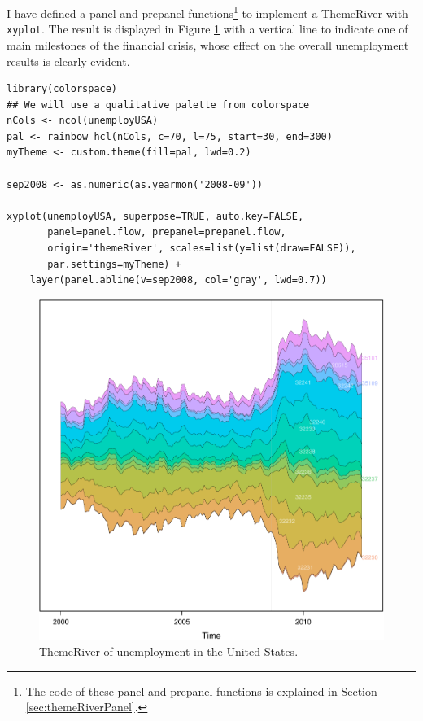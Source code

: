 \documentclass[smallroyalvopaper]{memoir}
\begin{document}
I have defined a panel and prepanel functions\footnote{The code of these panel and prepanel functions is explained
in Section \ref{sec:themeRiverPanel}.} to implement a
ThemeRiver with \texttt{xyplot}. The result is displayed in Figure
\ref{fig:unemployUSAThemeRiver} with a vertical line to indicate
one of main milestones of the financial crisis, whose effect on
the overall unemployment results is clearly evident.
\lstset{language=R,numbers=none}
\begin{lstlisting}
library(colorspace)
## We will use a qualitative palette from colorspace
nCols <- ncol(unemployUSA)
pal <- rainbow_hcl(nCols, c=70, l=75, start=30, end=300)
myTheme <- custom.theme(fill=pal, lwd=0.2)

sep2008 <- as.numeric(as.yearmon('2008-09'))

xyplot(unemployUSA, superpose=TRUE, auto.key=FALSE,
       panel=panel.flow, prepanel=prepanel.flow,
       origin='themeRiver', scales=list(y=list(draw=FALSE)),
       par.settings=myTheme) +
    layer(panel.abline(v=sep2008, col='gray', lwd=0.7))
\end{lstlisting}

\begin{figure}[htb]
\centering
\includegraphics[width=.9\linewidth]{figs/unemployUSAThemeRiver.pdf}
\caption{\label{fig:unemployUSAThemeRiver}ThemeRiver of unemployment in the United States.}
\end{figure}
\end{document}
